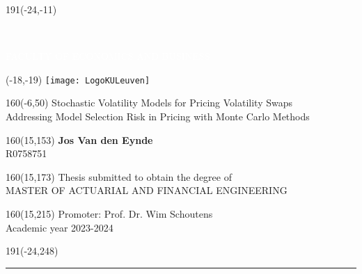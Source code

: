 \documentclass[12pt,a4paper,oneside]{report}
\begin{document}
\thispagestyle{empty}
\newcommand{\form}[1]{\scalebox{1.087}{\boldmath{#1}}}
\sffamily
%
\begin{textblock}{191}(-24,-11)
\colorbox{bluetitle}{\hspace{95mm}\ \parbox[c][18truemm]{94mm}{\textcolor{white}{FACULTY OF ECONOMICS AND BUSINESS}}}
\end{textblock}
%
\begin{textblock}{70}(-18,-19)
\textblockcolour{}
\texttt{[image: LogoKULeuven]}
\end{textblock}
%
\begin{textblock}{160}(-6,50)
\textblockcolour{}
\vspace{-\parskip}
\flushleft
\fontsize{40}{42}\selectfont \textcolor{bluetitle}{Stochastic Volatility Models for Pricing Volatility Swaps}\\[1.5mm]
\fontsize{20}{22}\selectfont Addressing Model Selection Risk in Pricing with Monte Carlo Methods
\end{textblock}
%
\begin{textblock}{160}(15,153)
\textblockcolour{}
\vspace{-\parskip}
\flushright
\fontsize{14}{16}\selectfont \textbf{Jos Van den Eynde}\\[6pt]
\fontsize{8}{10}\selectfont R0758751
\end{textblock}
%
\begin{textblock}{160}(15,173)
\textblockcolour{}
\vspace{-\parskip}
\flushright
Thesis submitted to obtain the degree of\\[4.5pt]
MASTER OF ACTUARIAL AND FINANCIAL ENGINEERING\\[4.5pt]
\end{textblock}
%
\begin{textblock}{160}(15,215)
\textblockcolour{}
\vspace{-\parskip}
\flushright
Promoter: Prof. Dr. Wim Schoutens\\[4.5pt]
Academic year 2023-2024
\end{textblock}
%
\begin{textblock}{191}(-24,248)
{\color{blueline}\rule{550pt}{5.5pt}}
\end{textblock}
%
\vfill
\newpage
\end{document}
